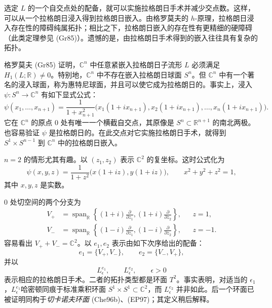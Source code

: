选定 $L$ 的一个自交点处的配备，就可以实施拉格朗日手术并减少交点数。这样，可以从一个拉格朗日浸入得到拉格朗日嵌入。由格罗莫夫的
$h$-原理，拉格朗日浸入存在性的障碍纯属拓扑；相比之下，拉格朗日嵌入的存在性有更精细的硬障碍（此类定理参见 (Gr85)）。遗憾的是，由拉格朗日手术得到的嵌入往往具有复杂的拓扑。

\begin{example}\label{ex:whitney-sphere-surgery}
格罗莫夫 (Gr85) 证明，$\mathbb C^n$ 中任意紧嵌入拉格朗日子流形 $L$ 必须满足
$H_1(L;\mathbb R)\ne0$。特别地，$\mathbb C^n$ 中不存在嵌入拉格朗日球面
$S^n$。但 $\mathbb C^n$ 中有一个著名的浸入球面，称为惠特尼球面，并且可以使它成为拉格朗日的。事实上，浸入
$\psi:S^n\to\mathbb C^n$ 有如下显式公式：
\begin{equation}
 \psi(x_1,\ldots,x_{n+1})
 =\frac1{1+x_{n+1}^2}
 \bigl(x_1(1+ix_{n+1}),x_2(1+ix_{n+1}),\ldots,x_n(1+ix_{n+1})\bigr).
 \label{eq:whitney-sphere-immersion}
\end{equation}
它在 $\mathbb C^n$ 的原点 $0$ 处有唯一一个横截自交点，其原像是
$S^n\subset\mathbb R^{n+1}$ 的南北两极。也容易验证 $\psi$ 是拉格朗日的。在此交点对它实施拉格朗日手术，就得到
$S^1\times S^{n-1}$ 到 $\mathbb C^n$ 中的拉格朗日嵌入。

$n=2$ 的情形尤其有趣。以 $(z_1,z_2)$ 表示 $\mathbb C^2$ 的复坐标。这时公式化为
\begin{equation}
 \psi(x,y,z)=\frac1{1+z^2}\bigl(x(1+iz),y(1+iz)\bigr),
 \qquad x^2+y^2+z^2=1,
 \label{eq:whitney-sphere-dimension-two}
\end{equation}
其中 $x,y,z$ 是实数。

$0$ 处切空间的两个分支为
\[
\begin{aligned}
 V_+&=\operatorname{span}_{\mathbb R}
 \left\{(1+i)\frac\partial{\partial z_1},
        (1+i)\frac\partial{\partial z_2}\right\},&&z=1,\\
 V_-&=\operatorname{span}_{\mathbb R}
 \left\{(1-i)\frac\partial{\partial z_1},
        (1-i)\frac\partial{\partial z_2}\right\},&&z=-1.
\end{aligned}
\]
容易看出 $V_++V_-=\mathbb C^2$。以 $e_1,e_2$ 表示由如下次序给出的配备：
\[
 e_1=\{V_+,V_-\},\qquad e_2=\{V_-,V_+\},
\]
并以
\[
 L_\epsilon^{e_1},\qquad L_\epsilon^{e_2},\qquad\epsilon>0
\]
表示相应的拉格朗日手术。二者的拓扑类型都是环面 $T^2$。事实表明，对适当的
$\epsilon_1$，$L_\epsilon^{e_1}$哈密顿同痕于标准乘积环面
$S^1\times S^1\subset\mathbb C^2$，而 $L_\epsilon^{e_2}$ 并非如此。后一个环面已被证明同构于\emph{切卡诺夫环面} (Che96b)、(EP97)；其定义稍后解释。
\end{example}

